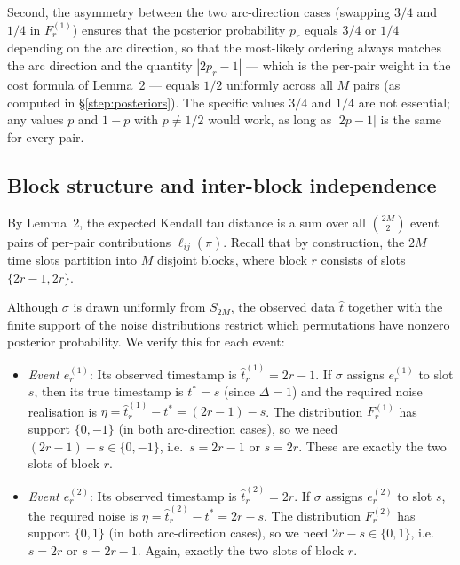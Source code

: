 \documentclass[11pt]{article}
\begin{document}
Second, the asymmetry between the two arc-direction cases (swapping $3/4$ and $1/4$ in $F_r^{(1)}$) ensures that the posterior probability $p_r$ equals $3/4$ or $1/4$ depending on the arc direction, so that the most-likely ordering always matches the arc direction and the quantity $|2p_r - 1|$ --- which is the per-pair weight in the cost formula of Lemma~2 --- equals $1/2$ uniformly across all $M$ pairs (as computed in \S\ref{step:posteriors}). The specific values $3/4$ and $1/4$ are not essential; any values $p$ and $1-p$ with $p \ne 1/2$ would work, as long as $|2p - 1|$ is the same for every pair.

\subsection{Block structure and inter-block independence}\label{step:blocks}

By Lemma~2, the expected Kendall tau distance is a sum over all $\binom{2M}{2}$ event pairs of per-pair contributions $\ell_{ij}(\hat{\pi})$. Recall that by construction, the $2M$ time slots partition into $M$ disjoint blocks, where block $r$ consists of slots $\{2r-1, 2r\}$.

Although $\sigma$ is drawn uniformly from $S_{2M}$, the observed data $\hat{t}$ together with the finite support of the noise distributions restrict which permutations have nonzero posterior probability. We verify this for each event:

\begin{itemize}
\item \emph{Event $e_r^{(1)}$}: Its observed timestamp is $\hat{t}_r^{(1)} = 2r - 1$. If $\sigma$ assigns $e_r^{(1)}$ to slot $s$, then its true timestamp is $t^* = s$ (since $\Delta = 1$) and the required noise realisation is $\eta = \hat{t}_r^{(1)} - t^* = (2r - 1) - s$. The distribution $F_r^{(1)}$ has support $\{0, -1\}$ (in both arc-direction cases), so we need $(2r - 1) - s \in \{0, -1\}$, i.e.\ $s = 2r - 1$ or $s = 2r$. These are exactly the two slots of block $r$.

\item \emph{Event $e_r^{(2)}$}: Its observed timestamp is $\hat{t}_r^{(2)} = 2r$. If $\sigma$ assigns $e_r^{(2)}$ to slot $s$, the required noise is $\eta = \hat{t}_r^{(2)} - t^* = 2r - s$. The distribution $F_r^{(2)}$ has support $\{0, 1\}$ (in both arc-direction cases), so we need $2r - s \in \{0, 1\}$, i.e.\ $s = 2r$ or $s = 2r - 1$. Again, exactly the two slots of block $r$.
\end{itemize}
\end{document}
